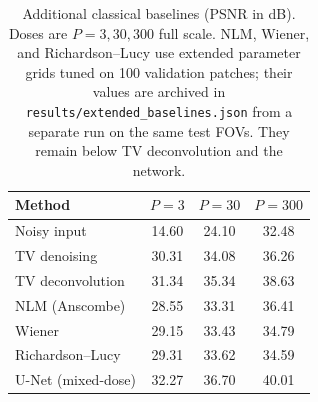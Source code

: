 \documentclass[11pt]{article}
\begin{document}
\begin{table}[h]
\centering
\caption{Additional classical baselines (PSNR in dB). Doses are $P=3,30,300$
full scale. NLM, Wiener, and Richardson--Lucy use extended parameter grids
tuned on 100 validation patches; their values are archived in
\texttt{results/extended\_baselines.json} from a separate run on the same test
FOVs. They
remain below TV deconvolution and the network.}
\label{tab:extended}
\begin{tabular}{lccc}
\toprule
Method & $P=3$ & $P=30$ & $P=300$ \\
\midrule
Noisy input & 14.60 & 24.10 & 32.48 \\
TV denoising & 30.31 & 34.08 & 36.26 \\
TV deconvolution & 31.34 & 35.34 & 38.63 \\
NLM (Anscombe) & 28.55 & 33.31 & 36.41 \\
Wiener & 29.15 & 33.43 & 34.79 \\
Richardson--Lucy & 29.31 & 33.62 & 34.59 \\
U-Net (mixed-dose) & 32.27 & 36.70 & 40.01 \\
\bottomrule
\end{tabular}
\end{table}

\begin{table}[t]
\centering
\caption{Validation-selected fixed doses. The dose is the smallest one reaching
90\% success on the 20 validation FOVs and is then applied unchanged to test.
A dash under test success means the validation-selected dose did not reach 90\%
on the held-out FOVs; the factor is then also shown as a dash because it is not
claimed.}
\label{tab:protocol}

\end{table}

\begin{table}[t]
\centering
\caption{Test-oracle protocol doses (upper bound): the smallest dose reaching
90\% success on the test FOVs. This is not a deployable selection rule and is
reported only for comparison with the validation-selected table.}
\label{tab:protocoloracle}

\end{table}

\begin{table}[t]
\centering
\caption{Ablations (PSNR in dB, matched patches). Top: original base budget,
with per-dose specialists (16k patches/60 epochs), the mixed-dose model
(24k/100), the dose-conditioned variant (24k/100), the phase-scrambled control
(24k/100, conditioned architecture), and tuned TV deconvolution. Middle: the
budget-matched specialists, mixed-dose model, dose-conditioned variant, and
blind phase-scrambled control (all 64 channels, 48k patches, 150 epochs).
Bottom: PSF width at $P=30$ for the strong mixed-dose model.}
\label{tab:ablation}
\small

\end{table}
\end{document}
